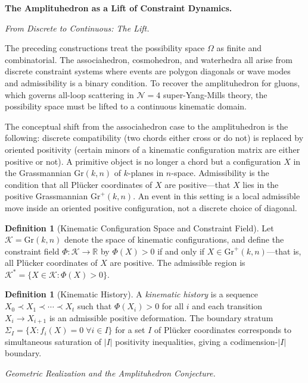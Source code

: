 \documentclass[12pt, oneside]{amsart}
\theoremstyle{plain}
\theoremstyle{definition}
\newtheorem{definition}[theorem]{Definition}
\theoremstyle{remark}
\newcommand{\R}{\mathbb{R}}
\newcommand{\Gr}{\mathrm{Gr}}
\newcommand{\Phif}{\Phi}
\newcommand{\OmKS}{\Omega}
\begin{document}
\bigskip\noindent\textbf{The Amplituhedron as a Lift of Constraint Dynamics.}
\label{sec:amplituhedron}

\medskip\noindent\textit{From Discrete to Continuous: The Lift.}

The preceding constructions treat the possibility space $\OmKS$ as finite and combinatorial. The associahedron, cosmohedron, and waterhedra all arise from discrete constraint systems where events are polygon diagonals or wave modes and admissibility is a binary condition. To recover the amplituhedron for gluons, which governs all-loop scattering in $\mathcal{N}=4$ super-Yang-Mills theory, the possibility space must be lifted to a continuous kinematic domain.

The conceptual shift from the associahedron case to the amplituhedron is the following: discrete compatibility (two chords either cross or do not) is replaced by oriented positivity (certain minors of a kinematic configuration matrix are either positive or not). A primitive object is no longer a chord but a configuration $X$ in the Grassmannian $\Gr(k,n)$ of $k$-planes in $n$-space. Admissibility is the condition that all Pl\"ucker coordinates of $X$ are positive---that $X$ lies in the positive Grassmannian $\mathrm{Gr}^+(k,n)$. An event in this setting is a local admissible move inside an oriented positive configuration, not a discrete choice of diagonal.

\begin{definition}[Kinematic Configuration Space and Constraint Field]
Let $\mathcal{K} = \Gr(k,n)$ denote the space of kinematic configurations, and define the constraint field $\Phif: \mathcal{K} \to \R$ by $\Phif(X) > 0$ if and only if $X \in \mathrm{Gr}^+(k,n)$---that is, all Pl\"ucker coordinates of $X$ are positive. The admissible region is $\mathcal{K}^* = \{X \in \mathcal{K} : \Phif(X) > 0\}$.
\end{definition}

\begin{definition}[Kinematic History]
A \emph{kinematic history} is a sequence $X_0 \prec X_1 \prec \cdots \prec X_t$ such that $\Phif(X_i) > 0$ for all $i$ and each transition $X_i \to X_{i+1}$ is an admissible positive deformation. The boundary stratum $\Sigma_I = \{X : f_i(X) = 0 \; \forall i \in I\}$ for a set $I$ of Pl\"ucker coordinates corresponds to simultaneous saturation of $|I|$ positivity inequalities, giving a codimension-$|I|$ boundary.
\end{definition}

\medskip\noindent\textit{Geometric Realization and the Amplituhedron Conjecture.}
\end{document}
